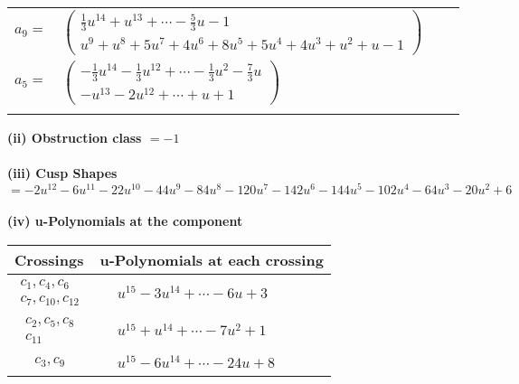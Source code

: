 \documentclass[1p]{elsarticle_modified}
\theoremstyle{definition}
\begin{document}
\begin{tabular}{m{7pt} m{180pt} m{7pt} m{180pt} }
\flushright $a_{9}=$&$\begin{pmatrix}\frac{1}{3} u^{14}+u^{13}+\cdots-\frac{5}{3} u-1\\u^9+u^8+5 u^7+4 u^6+8 u^5+5 u^4+4 u^3+u^2+u-1\end{pmatrix}$ \\
\flushright $a_{5}=$&$\begin{pmatrix}-\frac{1}{3} u^{14}-\frac{1}{3} u^{12}+\cdots-\frac{1}{3} u^2-\frac{7}{3} u\\- u^{13}-2 u^{12}+\cdots+u+1\end{pmatrix}$\\&\end{tabular}
\flushleft \textbf{(ii) Obstruction class $= -1$}\\~\\
\flushleft \textbf{(iii) Cusp Shapes $= -2 u^{12}-6 u^{11}-22 u^{10}-44 u^9-84 u^8-120 u^7-142 u^6-144 u^5-102 u^4-64 u^3-20 u^2+6$}\\~\\
\newpage\renewcommand{\arraystretch}{1}
\flushleft \textbf{(iv) u-Polynomials at the component}\newline \\
\begin{tabular}{m{50pt}|m{274pt}}
Crossings & \hspace{64pt}u-Polynomials at each crossing \\
\hline $$\begin{aligned}c_{1},c_{4},c_{6}\\c_{7},c_{10},c_{12}\end{aligned}$$&$\begin{aligned}
&u^{15}-3 u^{14}+\cdots-6 u+3
\end{aligned}$\\
\hline $$\begin{aligned}c_{2},c_{5},c_{8}\\c_{11}\end{aligned}$$&$\begin{aligned}
&u^{15}+u^{14}+\cdots-7 u^2+1
\end{aligned}$\\
\hline $$\begin{aligned}c_{3},c_{9}\end{aligned}$$&$\begin{aligned}
&u^{15}-6 u^{14}+\cdots-24 u+8
\end{aligned}$\\
\hline
\end{tabular}\\~\\
\end{document}
